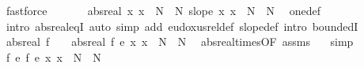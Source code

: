 \begin{isabellebody}
\ fastforce\isanewline
\ \ \isamarkupfalse%
\ {\isacharasterisk}{\kern0pt}{\isacharcolon}{\kern0pt}\ {\isachardoublequoteopen}{}\ {\isacharequal}{\kern0pt}\ abs{\isacharunderscore}{\kern0pt}real\ {\isacharparenleft}{\kern0pt}{\isasymlambda}x{\isachardot}{\kern0pt}\ x\ {\isacharplus}{\kern0pt}\ N{\isacharprime}{\kern0pt}\ {\isacharminus}{\kern0pt}\ N{\isacharparenright}{\kern0pt}{\isachardoublequoteclose}\ {\isachardoublequoteopen}slope\ {\isacharparenleft}{\kern0pt}{\isasymlambda}x{\isachardot}{\kern0pt}\ x\ {\isacharplus}{\kern0pt}\ N{\isacharprime}{\kern0pt}\ {\isacharminus}{\kern0pt}\ N{\isacharparenright}{\kern0pt}{\isachardoublequoteclose}\ \isamarkupfalse%
\ one{\isacharunderscore}{\kern0pt}def\ \isamarkupfalse%
\ {\isacharparenleft}{\kern0pt}intro\ abs{\isacharunderscore}{\kern0pt}real{\isacharunderscore}{\kern0pt}eqI{\isacharparenright}{\kern0pt}\ {\isacharparenleft}{\kern0pt}auto\ simp\ add{\isacharcolon}{\kern0pt}\ eudoxus{\isacharunderscore}{\kern0pt}rel{\isacharunderscore}{\kern0pt}def\ slope{\isacharunderscore}{\kern0pt}def\ intro{\isacharbang}{\kern0pt}{\isacharcolon}{\kern0pt}\ boundedI{\isacharparenright}{\kern0pt}\isanewline
\ \ \isamarkupfalse%
\ {\isachardoublequoteopen}abs{\isacharunderscore}{\kern0pt}real\ f\ {\isacharasterisk}{\kern0pt}\ {}\ {\isacharequal}{\kern0pt}\ abs{\isacharunderscore}{\kern0pt}real\ {\isacharparenleft}{\kern0pt}f\ {\isacharasterisk}{\kern0pt}\isactrlsub e\ {\isacharparenleft}{\kern0pt}{\isasymlambda}x{\isachardot}{\kern0pt}\ x\ {\isacharplus}{\kern0pt}\ N{\isacharprime}{\kern0pt}\ {\isacharminus}{\kern0pt}\ N{\isacharparenright}{\kern0pt}{\isacharparenright}{\kern0pt}{\isachardoublequoteclose}\ \isamarkupfalse%
\ abs{\isacharunderscore}{\kern0pt}real{\isacharunderscore}{\kern0pt}times{\isacharbrackleft}{\kern0pt}OF\ assms{\isacharparenleft}{\kern0pt}{}{\isacharparenright}{\kern0pt}\ {\isacharasterisk}{\kern0pt}{\isacharparenleft}{\kern0pt}{}{\isacharparenright}{\kern0pt}{\isacharbrackright}{\kern0pt}\ \isamarkupfalse%
\ simp\isanewline
\ \ \isamarkupfalse%
\ {\isachardoublequoteopen}f\ {\isasymsim}\isactrlsub e\ {\isacharparenleft}{\kern0pt}f\ {\isacharasterisk}{\kern0pt}\isactrlsub e\ {\isacharparenleft}{\kern0pt}{\isasymlambda}x{\isachardot}{\kern0pt}\ x\ {\isacharplus}{\kern0pt}\ N{\isacharprime}{\kern0pt}\ {\isacharminus}{\kern0pt}\ N{\isacharparenright}{\kern0pt}{\isacharparenright}{\kern0pt}{\isachardoublequoteclose}\ \isamarkupfalse%

\end{isabellebody}
